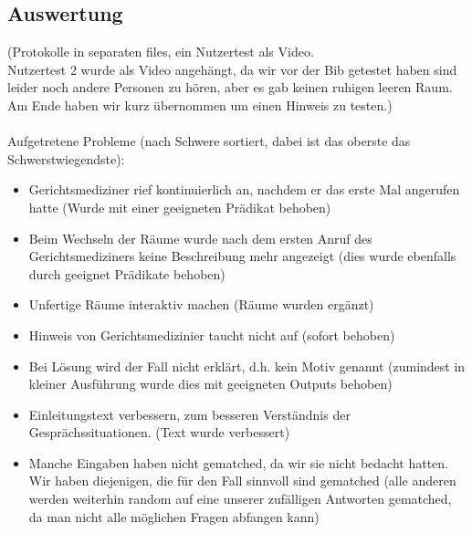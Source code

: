 \documentclass[10pt,a4paper]{article}
\begin{document}
\subsection*{Auswertung}
(Protokolle in separaten files, ein Nutzertest als Video.\\
Nutzertest 2 wurde als Video angehängt, da wir vor der Bib getestet haben sind leider noch andere Personen zu hören, aber es gab keinen ruhigen leeren Raum. Am Ende haben wir kurz übernommen um einen Hinweis zu testen.)\\
\\
Aufgetretene Probleme (nach Schwere sortiert, dabei ist das oberste das Schwerstwiegendste):
\begin{itemize}
\item Gerichtsmediziner rief kontinuierlich an, nachdem er das erste Mal angerufen hatte (Wurde mit einer geeigneten Prädikat behoben)
\item Beim Wechseln der Räume wurde nach dem ersten Anruf des Gerichtsmediziners keine Beschreibung mehr angezeigt (dies wurde ebenfalls durch geeignet Prädikate behoben)
\item Unfertige Räume interaktiv machen (Räume wurden ergänzt)
\item Hinweis von Gerichtsmedizinier taucht nicht auf (sofort behoben)
\item Bei Lösung wird der Fall nicht erklärt, d.h. kein Motiv genannt (zumindest in kleiner Ausführung wurde dies mit geeigneten Outputs behoben)
\item Einleitungstext verbessern, zum besseren Verständnis der Gesprächssituationen. (Text wurde verbessert)
\item Manche Eingaben haben nicht gematched, da wir sie nicht bedacht hatten. Wir haben diejenigen, die für den Fall sinnvoll sind gematched (alle anderen werden weiterhin random auf eine unserer zufälligen Antworten gematched, da man nicht alle möglichen Fragen abfangen kann)
\end{itemize}




\newpage
\end{document}
